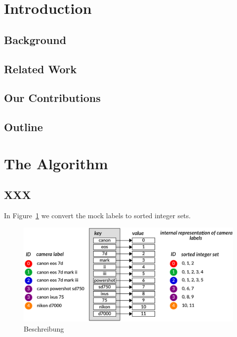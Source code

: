 \documentclass[sigconf]{acmart}
\begin{document}
\let\thefootnote\relax{}


\section{Introduction}


\subsection{Background}

\subsection{Related Work}

\subsection{Our Contributions}

\subsection{Outline}



\section{The Algorithm}

\subsection{XXX}
\label{sub:sec:xxx}


In Figure~\ref{fig:integer:sets} we convert the mock labels to sorted integer sets.



\begin{figure}[htbp]
  \centering
  \includegraphics[width=\linewidth]{./graphics/integer_sets.pdf}
  \caption{Beschreibung} 
  \label{fig:integer:sets}
\end{figure}
\end{document}
